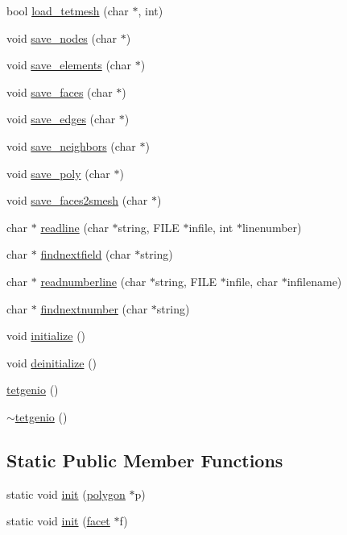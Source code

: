 \begin{DoxyCompactItemize}
bool \hyperlink{classtetgenio_ae7f0c3300cec04c22b7659b27c5e3dae}{load\+\_\+tetmesh} (char $\ast$, int)
\item 
void \hyperlink{classtetgenio_a80500674e90ab22d30f1d56a9a15cd3c}{save\+\_\+nodes} (char $\ast$)
\item 
void \hyperlink{classtetgenio_a9201c6478b6e805091b548d5a31c9236}{save\+\_\+elements} (char $\ast$)
\item 
void \hyperlink{classtetgenio_a3a3cf78a000db81c949ebea34609a8a0}{save\+\_\+faces} (char $\ast$)
\item 
void \hyperlink{classtetgenio_aee72faff0abaf56e1b59596c29188828}{save\+\_\+edges} (char $\ast$)
\item 
void \hyperlink{classtetgenio_a1b3b4554c3ddfe5c93860aa5630eb762}{save\+\_\+neighbors} (char $\ast$)
\item 
void \hyperlink{classtetgenio_ac512604429e7c754f3128a94133babdd}{save\+\_\+poly} (char $\ast$)
\item 
void \hyperlink{classtetgenio_a5f74cc6e1f7264c70049cde809b083e2}{save\+\_\+faces2smesh} (char $\ast$)
\item 
char $\ast$ \hyperlink{classtetgenio_a2f0901949c6326c7106e2351d4f63b78}{readline} (char $\ast$string, F\+I\+LE $\ast$infile, int $\ast$linenumber)
\item 
char $\ast$ \hyperlink{classtetgenio_aec92b55ff7b21113637a2d73ea313377}{findnextfield} (char $\ast$string)
\item 
char $\ast$ \hyperlink{classtetgenio_a8a370efd196e33de3d62ff1ed2e8cb63}{readnumberline} (char $\ast$string, F\+I\+LE $\ast$infile, char $\ast$infilename)
\item 
char $\ast$ \hyperlink{classtetgenio_a3d366fca66da6b1a5a0cdd27fd12fa3e}{findnextnumber} (char $\ast$string)
\item 
void \hyperlink{classtetgenio_ac164a365a6a479bb31cd40443f5bd989}{initialize} ()
\item 
void \hyperlink{classtetgenio_afcc5a8855570b36717070f3f47e3ef2a}{deinitialize} ()
\item 
\hyperlink{classtetgenio_ad1fbb1c5d4dae0afc09b40eb498ca275}{tetgenio} ()
\item 
\hyperlink{classtetgenio_af54f8705453a9421aafd500ed9435d2a}{$\sim$tetgenio} ()
\end{DoxyCompactItemize}
\subsection*{Static Public Member Functions}
\begin{DoxyCompactItemize}
\item 
static void \hyperlink{classtetgenio_aca2fd0dcb29ee3cd313a74d55df2ff2c}{init} (\hyperlink{structtetgenio_1_1polygon}{polygon} $\ast$p)
\item 
static void \hyperlink{classtetgenio_a54b1b29c83d5c6e1466bbb087fe1f80e}{init} (\hyperlink{structtetgenio_1_1facet}{facet} $\ast$f)
\end{DoxyCompactItemize}
